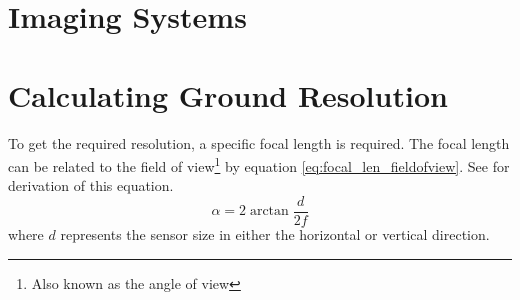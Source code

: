 \section{Imaging Systems}
\section{Calculating Ground Resolution}\label{sec:ground_res}
To get the required resolution, a specific focal length is required. The focal length can be related to the field of view\footnote{Also known as the angle of view} by equation \eqref{eq:focal_len_fieldofview}. See \cite{wiki_aov2016} for derivation of this equation.
\begin{equation}
\label{eq:focal_len_fieldofview}
\alpha = 2\arctan{\frac{d}{2f}}
\end{equation}
where $d$ represents the sensor size in either the horizontal or vertical direction.

